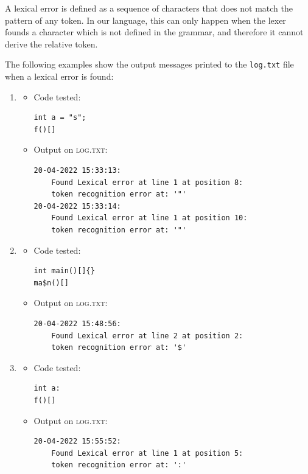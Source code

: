 \documentclass[11pt]{article} %
\begin{document}
\medskip

A lexical error is defined as a sequence of characters that does not match the pattern of any token. In our language, this can only happen when the lexer founds a character which is not defined in the grammar, and therefore it cannot derive the relative token. 

\medskip

The following examples show the output messages printed to the \verb|log.txt| file when a lexical error is found:
\begin{enumerate}
\item
	\begin{itemize}
		\item Code tested: \begin{lstlisting}
int a = "s";   
f()[]		\end{lstlisting}
		\item Output on \textsc{log.txt}: \begin{lstlisting}
20-04-2022 15:33:13: 
    Found Lexical error at line 1 at position 8: 
    token recognition error at: '"'
20-04-2022 15:33:14: 
    Found Lexical error at line 1 at position 10: 
    token recognition error at: '"'		\end{lstlisting}
	\end{itemize}
\item
\begin{itemize}
\item Code tested: \begin{lstlisting}
int main()[]{}
ma$n()[]
\end{lstlisting}
\item Output on \textsc{log.txt}: \begin{lstlisting}
20-04-2022 15:48:56: 
    Found Lexical error at line 2 at position 2: 
    token recognition error at: '$'
\end{lstlisting}
\end{itemize}
\item
	\begin{itemize}
	\item Code tested: \begin{lstlisting}
int a:
f()[]	\end{lstlisting}
	\item Output on \textsc{log.txt}: \begin{lstlisting}
20-04-2022 15:55:52: 
    Found Lexical error at line 1 at position 5: 
    token recognition error at: ':'	\end{lstlisting}
	\end{itemize}
\end{enumerate}
\end{document}
